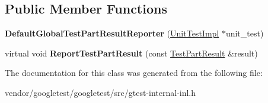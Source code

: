 \subsection*{Public Member Functions}
\begin{DoxyCompactItemize}
\item 
{\bfseries Default\+Global\+Test\+Part\+Result\+Reporter} (\hyperlink{classtesting_1_1internal_1_1UnitTestImpl}{Unit\+Test\+Impl} $\ast$unit\+\_\+test)\hypertarget{classtesting_1_1internal_1_1DefaultGlobalTestPartResultReporter_a3900ea7f34b34afd48c7d1d0312a1488}{}\label{classtesting_1_1internal_1_1DefaultGlobalTestPartResultReporter_a3900ea7f34b34afd48c7d1d0312a1488}

\item 
virtual void {\bfseries Report\+Test\+Part\+Result} (const \hyperlink{classtesting_1_1TestPartResult}{Test\+Part\+Result} \&result)\hypertarget{classtesting_1_1internal_1_1DefaultGlobalTestPartResultReporter_a92cd8be4f8932fcc26006ee4a6cf8556}{}\label{classtesting_1_1internal_1_1DefaultGlobalTestPartResultReporter_a92cd8be4f8932fcc26006ee4a6cf8556}

\end{DoxyCompactItemize}


The documentation for this class was generated from the following file\+:\begin{DoxyCompactItemize}
\item 
vendor/googletest/googletest/src/gtest-\/internal-\/inl.\+h\end{DoxyCompactItemize}
